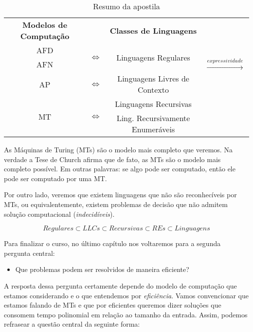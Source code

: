 \begin{table}[htbp]
  \centering
  \begin{tabular}{|ccc|c|}
    \hline
    {\bf Modelos de Computação} && {\bf Classes de Linguagens} & \multirow{5}{*}{\begin{turn}{-90}$\xrightarrow{expressividade}$\end{turn}}\\
    \cline{1-3}
    AFD & \multirow{2}{*}{$\Leftrightarrow$} & \multirow{2}{*}{Linguagens Regulares}& \\
    AFN  &&&\\
    \cline{1-3}
    AP & $\Leftrightarrow$ & Linguagens Livres de Contexto &\\
    \cline{1-3}
    \multirow{2}{*}{MT} & \multirow{2}{*}{$\Leftrightarrow$} & Linguagens Recursivas &\\
    & & Ling. Recursivamente Enumeráveis &\\
    \hline
  \end{tabular}
  \caption{Resumo da apostila}
  \label{tab:resumo}
\end{table}


As Máquinas de Turing (MTs) são o modelo mais completo que veremos.
Na verdade a Tese de Church afirma que de fato, as MTs são o modelo mais completo possível.
Em outras palavras: se algo pode ser computado, então ele pode ser computado por uma MT.

Por outro lado, veremos que existem linguagens que não são reconhecíveis por MTs, ou equivalentemente, existem problemas de decisão que não admitem solução computacional ({\em indecidíveis}).

\begin{displaymath}
  Regulares \subset LLCs \subset Recursivas \subset REs \subset Linguagens
\end{displaymath}


Para finalizar o curso, no último capítulo nos voltaremos para a segunda pergunta central:
\begin{itemize}
\item Que problemas podem ser resolvidos de maneira eficiente?
\end{itemize}

A resposta dessa pergunta certamente depende do modelo de computação que estamos considerando e o que entendemos por {\em eficiência}.
Vamos convencionar que estamos falando de MTs e que por eficientes queremos dizer soluções que consomem tempo polinomial em relação ao tamanho da entrada.
Assim, podemos refrasear a questão central da seguinte forma:

